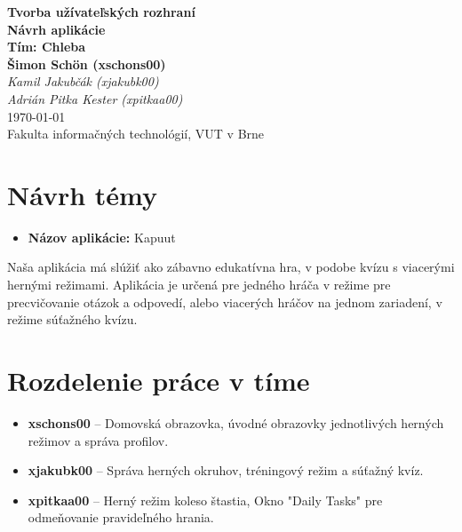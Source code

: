 \documentclass[a4paper,12pt]{article}
\begin{document}
    
\begin{titlepage}
	\centering
	\vspace*{3cm}
	{\Huge \textbf{Tvorba užívateľských rozhraní}}\\[1em]
	{\Large \textbf{Návrh aplikácie}}\\[5em]
	    	    
	{\Large \textbf{Tím: Chleba}}\\[2em]
	{\large
		\textbf{Šimon Schön (xschons00)}\\
		\textit{Kamil Jakubčák (xjakubk00)}\\
		\textit{Adrián Pitka Kester (xpitkaa00)}
		}\\[6em]
	    	    
	{\large \today}\\[20em]
	    	    
	{\large Fakulta informačných technológií, VUT v Brne}
	\vfill
\end{titlepage}
    
\tableofcontents
\newpage
    
\section{Návrh témy}
\begin{itemize}
	\item \textbf{Názov aplikácie:} Kapuut \\
\end{itemize}
    
Naša aplikácia má slúžiť ako zábavno edukatívna hra, v podobe kvízu s viacerými hernými režimami. Aplikácia je určená pre jedného hráča v režime pre precvičovanie otázok a odpovedí, alebo viacerých hráčov na jednom zariadení, v režime súťažného kvízu.
    
    
\section{Rozdelenie práce v tíme}
\begin{itemize}
	\item \textbf{xschons00} – Domovská obrazovka, úvodné obrazovky jednotlivých herných režimov a správa profilov.
	\item \textbf{xjakubk00} – Správa herných okruhov, tréningový režim a súťažný kvíz.
	\item \textbf{xpitkaa00} – Herný režim koleso štastia, Okno "Daily Tasks" pre odmeňovanie pravideľného hrania.
\end{itemize}
\end{document}
